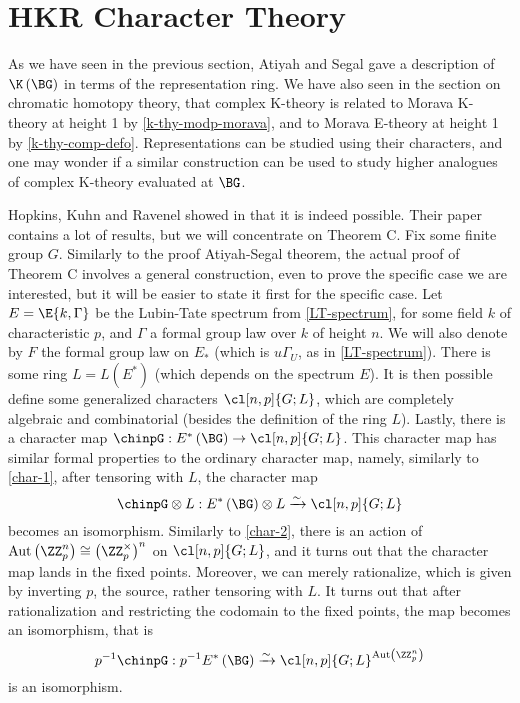 \section{HKR Character Theory}

As we have seen in the previous section, Atiyah and Segal gave a description of $\K\left(\BG\right)$ in terms of the representation ring.
We have also seen in the section on chromatic homotopy theory, that complex K-theory is related to Morava K-theory at height 1 by \ref{k-thy-modp-morava}, and to Morava E-theory at height 1 by \ref{k-thy-comp-defo}.
Representations can be studied using their characters, and one may wonder if a similar construction can be used to study higher analogues of complex K-theory evaluated at $\BG$.

Hopkins, Kuhn and Ravenel showed in \cite{HKR} that it is indeed possible.
Their paper contains a lot of results, but we will concentrate on Theorem C.
Fix some finite group $G$.
Similarly to the proof Atiyah-Segal theorem, the actual proof of Theorem C involves a general construction, even to prove the specific case we are interested, but it will be easier to state it first for the specific case.
Let $E = \E{k, \Gamma}$ be the Lubin-Tate spectrum from \ref{LT-spectrum}, for some field $k$ of characteristic $p$, and $\Gamma$ a formal group law over $k$ of height $n$.
We will also denote by $F$ the formal group law on $E_*$ (which is $u \Gamma_U$, as in \ref{LT-spectrum}).
There is some ring $L = L\left(E^*\right)$ (which depends on the spectrum $E$).
It is then possible define some generalized characters $\cl[n,p]{G; L}$, which are completely algebraic and combinatorial (besides the definition of the ring $L$).
Lastly, there is a character map $\chinpG: E^*\left(\BG\right) \to \cl[n,p]{G; L}$.
This character map has similar formal properties to the ordinary character map, namely, similarly to \ref{char-1}, after tensoring with $L$, the character map
$$
\chinpG \otimes L:
E^*\left(\BG\right) \otimes L
\xrightarrow{\sim} \cl[n,p]{G; L}
$$
becomes an isomorphism.
Similarly to \ref{char-2}, there is an action of $\aut\left(\ZZ_p^n\right) \cong \left(\ZZ_p^\times\right)^n$ on $\cl[n,p]{G; L}$, and it turns out that the character map lands in the fixed points.
Moreover, we can merely rationalize, which is given by inverting $p$, the source, rather tensoring with $L$.
It turns out that after rationalization and restricting the codomain to the fixed points, the map becomes an isomorphism, that is
$$
p^{-1} \chinpG:
p^{-1} E^*\left(\BG\right)
\xrightarrow{\sim} \cl[n,p]{G; L}^{\aut\left(\ZZ_p^n\right)}
$$
is an isomorphism.

